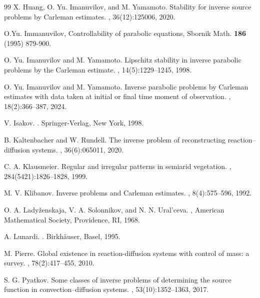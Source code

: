 \documentclass[12pt]{amsart}
\theoremstyle{plain}
\theoremstyle{definition}
\theoremstyle{remark}
\begin{document}
\begin{thebibliography}{99}
X. Huang, O. Yu. Imanuvilov, and M. Yamamoto.
\newblock Stability for inverse source problems by Carleman estimates.
, 36(12):125006, 2020.

O.Yu. Immanuvilov, Controllability of parabolic equations, Sbornik Math. 
{\bf 186} (1995) 879-900.

O. Yu. Imanuvilov and M. Yamamoto.
\newblock Lipschitz stability in inverse parabolic problems by the Carleman estimate.
, 14(5):1229--1245, 1998.

O. Yu. Imanuvilov and M. Yamamoto.
\newblock Inverse parabolic problems by Carleman estimates with data taken at initial or final time moment of observation.
, 18(2):366--387, 2024.

V. Isakov.
.
\newblock Springer-Verlag, New York, 1998.

B. Kaltenbacher and W. Rundell.
\newblock The inverse problem of reconstructing reaction--diffusion systems.
, 36(6):065011, 2020.

C. A. Klausmeier.
\newblock Regular and irregular patterns in semiarid vegetation.
, 284(5421):1826--1828, 1999.

M. V. Klibanov.
\newblock Inverse problems and Carleman estimates.
, 8(4):575--596, 1992.

O. A. Lady{\v z}enskaja, V. A. Solonnikov, and N. N. Ural'ceva.
, 
\newblock American Mathematical Society, Providence, RI, 1968.

A. Lunardi.
. 
\newblock Birkh\"auser, Basel, 1995.

M. Pierre.
\newblock Global existence in reaction-diffusion systems with control of mass: a survey.
, 78(2):417--455, 2010.

S. G. Pyatkov.
\newblock Some classes of inverse problems of determining the source function in convection--diffusion systems.
, 53(10):1352--1363, 2017.


\end{thebibliography}
\end{document}
